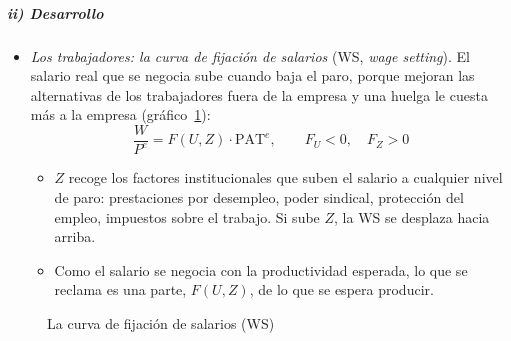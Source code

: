 \documentclass[11pt]{article}
\begin{document}
\subparagraph{ii) Desarrollo}

\begin{itemize}
\item \emph{Los trabajadores: la curva de fijación de salarios} (WS, \emph{wage setting}). El salario real que se negocia sube cuando baja el paro, porque mejoran las alternativas de los trabajadores fuera de la empresa y una huelga le cuesta más a la empresa (gráfico~\ref{fig:ws-curva}):
  \begin{equation}
  \frac{W}{P^e}=F(U,Z)\cdot\mathrm{PAT}^e,\qquad F_U<0,\quad F_Z>0 \label{eq:ws}
  \end{equation}
  \begin{itemize}
  \item $Z$ recoge los factores institucionales que suben el salario a cualquier nivel de paro: prestaciones por desempleo, poder sindical, protección del empleo, impuestos sobre el trabajo. Si sube $Z$, la WS se desplaza hacia arriba.
  \item Como el salario se negocia con la productividad esperada, lo que se reclama es una parte, $F(U,Z)$, de lo que se espera producir.
  \end{itemize}
\end{itemize}

\begin{figure}[H]
\centering
\caption{La curva de fijación de salarios (WS)}\label{fig:ws-curva}
\end{figure}
\end{document}
